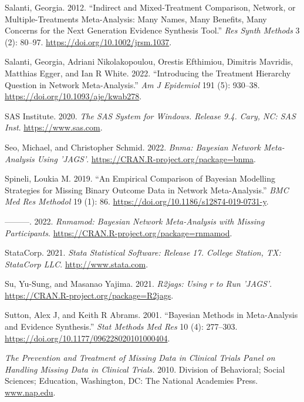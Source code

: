 \begin{CSLReferences}{1}{0}
\leavevmode{}%
Salanti, Georgia. 2012. {``Indirect and Mixed-Treatment Comparison, Network, or Multiple-Treatments Meta-Analysis: Many Names, Many Benefits, Many Concerns for the Next Generation Evidence Synthesis Tool.''} \emph{Res Synth Methods} 3 (2): 80--97. \url{https://doi.org/10.1002/jrsm.1037}.

\leavevmode{}%
Salanti, Georgia, Adriani Nikolakopoulou, Orestis Efthimiou, Dimitris Mavridis, Matthias Egger, and Ian R White. 2022. {``Introducing the Treatment Hierarchy Question in Network Meta-Analysis.''} \emph{Am J Epidemiol} 191 (5): 930--38. \url{https://doi.org/10.1093/aje/kwab278}.

\leavevmode{}%
SAS Institute. 2020. \emph{{The SAS System for Windows}. Release 9.4. Cary, NC: SAS Inst}. \url{https://www.sas.com}.

\leavevmode{}%
Seo, Michael, and Christopher Schmid. 2022. \emph{Bnma: Bayesian Network Meta-Analysis Using 'JAGS'}. \url{https://CRAN.R-project.org/package=bnma}.

\leavevmode{}%
Spineli, Loukia M. 2019. {``An Empirical Comparison of Bayesian Modelling Strategies for Missing Binary Outcome Data in Network Meta-Analysis.''} \emph{BMC Med Res Methodol} 19 (1): 86. \url{https://doi.org/10.1186/s12874-019-0731-y}.

\leavevmode{}%
---------. 2022. \emph{Rnmamod: Bayesian Network Meta-Analysis with Missing Participants}. \url{https://CRAN.R-project.org/package=rnmamod}.

\leavevmode{}%
StataCorp. 2021. \emph{{Stata Statistical Software: Release 17}. College Station, TX: StataCorp LLC}. \url{http://www.stata.com}.

\leavevmode{}%
Su, Yu-Sung, and Masanao Yajima. 2021. \emph{R2jags: Using r to Run 'JAGS'}. \url{https://CRAN.R-project.org/package=R2jags}.

\leavevmode{}%
Sutton, Alex J, and Keith R Abrams. 2001. {``Bayesian Methods in Meta-Analysis and Evidence Synthesis.''} \emph{Stat Methods Med Res} 10 (4): 277--303. \url{https://doi.org/10.1177/096228020101000404}.

\leavevmode{}%
\emph{The Prevention and Treatment of Missing Data in Clinical Trials Panel on Handling Missing Data in Clinical Trials.} 2010. Division of Behavioral; Social Sciences; Education, Washington, DC: The National Academies Press. \href{https://www.nap.edu}{www.nap.edu}.


\end{CSLReferences}
